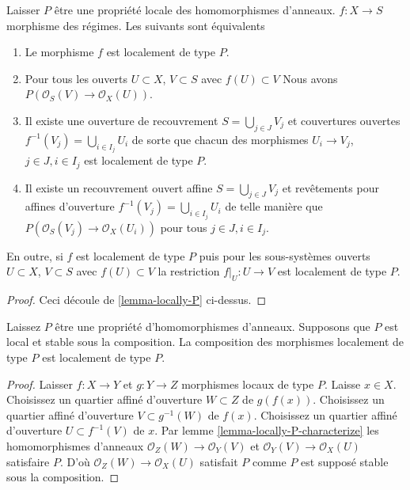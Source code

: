 \begin{lemma}

\label{lemma-locally-P-characterize}

Laisser $P$ être une propriété locale des homomorphismes d'anneaux. $f : X \to S$ morphisme des régimes. Les suivants sont équivalents

\begin{enumerate}

\item Le morphisme $f$ est localement de type $P$.
\item Pour tous les ouverts $U \subset X$, $V \subset S$
avec $f(U) \subset V$ Nous avons $P(\mathcal{O}_S(V) \to \mathcal{O}_X(U))$.
\item Il existe une ouverture de recouvrement $S = \bigcup_{j \in J} V_j$
et couvertures ouvertes $f^{-1}(V_j) = \bigcup_{i \in I_j} U_i$ de sorte que chacun des morphismes $U_i \to V_j$, $j\in J, i\in I_j$
est localement de type $P$.
\item Il existe un recouvrement ouvert affine $S = \bigcup_{j \in J} V_j$
et revêtements pour affines d'ouverture $f^{-1}(V_j) = \bigcup_{i \in I_j} U_i$ de telle manière que $P(\mathcal{O}_S(V_j) \to \mathcal{O}_X(U_i))$ pour tous
$j\in J, i\in I_j$.

\end{enumerate}

En outre, si $f$ est localement de type $P$ puis pour les sous-systèmes ouverts $U \subset X$, $V \subset S$ avec $f(U) \subset V$
la restriction $f|_U : U \to V$ est localement de type $P$.

\end{lemma}

\begin{proof}
Ceci découle de \ref{lemma-locally-P} ci-dessus.
\end{proof}

\begin{lemma}

\label{lemma-composition-type-P}
Laissez $P$ être une propriété d'homomorphismes d'anneaux. Supposons que $P$ est local et stable sous la composition. La composition des morphismes localement de type $P$ est localement de type $P$.
\end{lemma}

\begin{proof}

Laisser $f : X \to Y$ et $g : Y \to Z$ morphismes locaux de type $P$. Laisse $x \in X$. Choisissez un quartier affiné d'ouverture $W \subset Z$ de
$g(f(x))$. Choisissez un quartier affiné d'ouverture $V \subset g^{-1}(W)$
de $f(x)$. Choisissez un quartier affiné d'ouverture $U \subset f^{-1}(V)$
de $x$. Par lemme \ref{lemma-locally-P-characterize} les homomorphismes d'anneaux
$\mathcal{O}_Z(W) \to \mathcal{O}_Y(V)$ et
$\mathcal{O}_Y(V) \to \mathcal{O}_X(U)$ satisfaire $P$. D'où $\mathcal{O}_Z(W) \to \mathcal{O}_X(U)$ satisfait $P$
comme $P$ est supposé stable sous la composition.

\end{proof}

